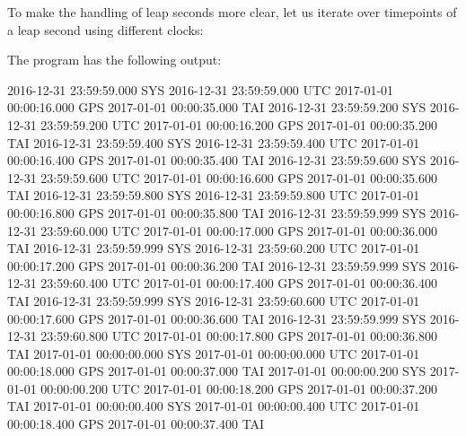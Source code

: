 To make the handling of leap seconds more clear, let us iterate over timepoints of a leap second using different clocks:



The program has the following output:

\begin{shell}
2016-12-31 23:59:59.000 SYS 2016-12-31 23:59:59.000 UTC 2017-01-01 00:00:16.000 GPS 2017-01-01 00:00:35.000 TAI
2016-12-31 23:59:59.200 SYS 2016-12-31 23:59:59.200 UTC 2017-01-01 00:00:16.200 GPS 2017-01-01 00:00:35.200 TAI
2016-12-31 23:59:59.400 SYS 2016-12-31 23:59:59.400 UTC 2017-01-01 00:00:16.400 GPS 2017-01-01 00:00:35.400 TAI
2016-12-31 23:59:59.600 SYS 2016-12-31 23:59:59.600 UTC 2017-01-01 00:00:16.600 GPS 2017-01-01 00:00:35.600 TAI
2016-12-31 23:59:59.800 SYS 2016-12-31 23:59:59.800 UTC 2017-01-01 00:00:16.800 GPS 2017-01-01 00:00:35.800 TAI
2016-12-31 23:59:59.999 SYS 2016-12-31 23:59:60.000 UTC 2017-01-01 00:00:17.000 GPS 2017-01-01 00:00:36.000 TAI
2016-12-31 23:59:59.999 SYS 2016-12-31 23:59:60.200 UTC 2017-01-01 00:00:17.200 GPS 2017-01-01 00:00:36.200 TAI
2016-12-31 23:59:59.999 SYS 2016-12-31 23:59:60.400 UTC 2017-01-01 00:00:17.400 GPS 2017-01-01 00:00:36.400 TAI
2016-12-31 23:59:59.999 SYS 2016-12-31 23:59:60.600 UTC 2017-01-01 00:00:17.600 GPS 2017-01-01 00:00:36.600 TAI
2016-12-31 23:59:59.999 SYS 2016-12-31 23:59:60.800 UTC 2017-01-01 00:00:17.800 GPS 2017-01-01 00:00:36.800 TAI
2017-01-01 00:00:00.000 SYS 2017-01-01 00:00:00.000 UTC 2017-01-01 00:00:18.000 GPS 2017-01-01 00:00:37.000 TAI
2017-01-01 00:00:00.200 SYS 2017-01-01 00:00:00.200 UTC 2017-01-01 00:00:18.200 GPS 2017-01-01 00:00:37.200 TAI
2017-01-01 00:00:00.400 SYS 2017-01-01 00:00:00.400 UTC 2017-01-01 00:00:18.400 GPS 2017-01-01 00:00:37.400 TAI
\end{shell}

